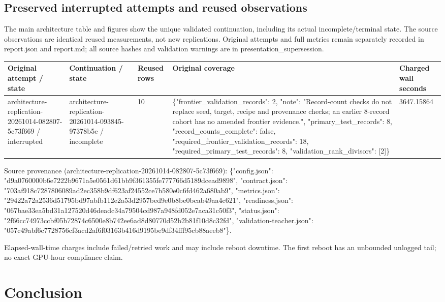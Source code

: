 \documentclass[10pt]{article}
\begin{document}
\subsection{Preserved interrupted attempts and reused observations}

The main architecture table and figures show the unique validated continuation, including its actual incomplete/terminal state. The source observations are identical reused measurements, not new replications. Original attempts and full metrics remain separately recorded in report.json and report.md; all source hashes and validation warnings are in presentation\_supersession.

{\scriptsize\setlength{\tabcolsep}{2pt}
\begin{longtable}{p{}p{}p{}p{}p{}}
Original attempt / state & Continuation / state & Reused rows & Original coverage & Charged wall seconds \\
\hline\endhead
architecture-replication-20261014-082807-5c73f669 / interrupted & architecture-replication-20261014-093845-97378b5e / incomplete & 10 & \{"frontier\_validation\_records": 2, "note": "Record-count checks do not replace seed, target, recipe and provenance checks; an earlier 8-record cohort has no amended frontier evidence.", "primary\_test\_records": 8, "record\_counts\_complete": false, "required\_frontier\_validation\_records": 18, "required\_primary\_test\_records": 8, "validation\_rank\_divisors": [2]\} & 3647.15864 \\
\end{longtable}}

Source provenance (architecture-replication-20261014-082807-5c73f669): \{"config.json": "d9a0760000b6e7222b9671a5e0561d61bb9f361355fe777766d5189dcead9898", "contract.json": "703af918c7287806089ad2ec358b9df623af24552ce7b580e0c6fd462a680ab9", "metrics.json": "29422a72a2536d51795bd97abfb112e2a53d2957bed9e0b8be0bcab49aa4c621", "readiness.json": "067bae33ea5bd31a127520d46deadc34a79504cd987a948fd052e7aca31c50f3", "status.json": "2f66cc74973ccbf05b72874c6500e8b742ee6ad8d80770d52b2b81f10d8c32fd", "validation-teacher.json": "057c49abf6c7728756cf3acd2af6f03163b416d9195be9df34fff95cb88aeeb8"\}.


Elapsed-wall-time charges include failed/retried work and may include reboot downtime. The first reboot has an unbounded unlogged tail; no exact GPU-hour compliance claim.

\section{Conclusion}
\end{document}

